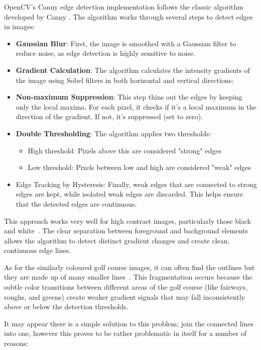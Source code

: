 \documentclass[final]{cmpreport_02}
\begin{document}
OpenCV's Canny edge detection implementation \citep{opencv_library} follows the classic algorithm developed by Canny \citep{canny1986computational}.
The algorithm works through several steps to detect edges in images:
\begin{itemize}
	\item \textbf{Gaussian Blur}: First, the image is smoothed with a Gaussian filter to reduce noise, as edge detection is highly sensitive to noise.
	\item \textbf{Gradient Calculation}: The algorithm calculates the intensity gradients of the image using Sobel filters in both horizontal and vertical directions:
	\item \textbf{Non-maximum Suppression}: This step thins out the edges by keeping only the local maxima. For each pixel, it checks if it's a local maximum in the direction of the gradient. If not, it's suppressed (set to zero).
	\item \textbf{Double Thresholding}: The algorithm applies two thresholds:
	      \begin{itemize}
		      \item High threshold: Pixels above this are considered "strong" edges
		      \item Low threshold: Pixels between low and high are considered "weak" edges
	      \end{itemize}
	\item Edge Tracking by Hysteresis: Finally, weak edges that are connected to strong edges are kept, while isolated weak edges are discarded. This helps ensure that the detected edges are continuous.
\end{itemize}
This approach works very well for high contrast images, particularly those black and white~. The clear separation between foreground and background elements allows the algorithm to detect distinct gradient changes and create clean, continuous edge lines.

As for the similarly coloured golf course images, it can often find the outlines but they are made up of many smaller lines~. This fragmentation occurs because the subtle color transitions between different areas of the golf course (like fairways, roughs, and greens) create weaker gradient signals that may fall inconsistently above or below the detection thresholds.

It may appear there is a simple solution to this problem; join the connected lines into one, however this proves to be rather problematic in itself for a number of reasons:
\end{document}
